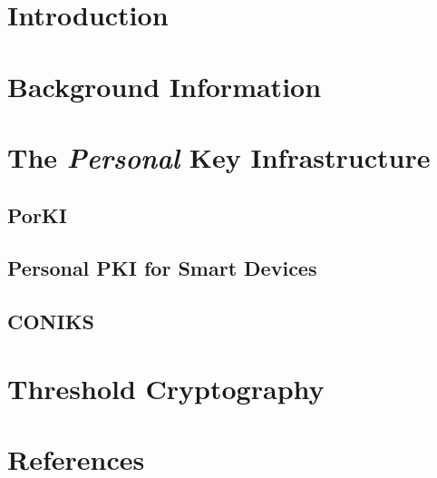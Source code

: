 \section{Introduction}


\section{Background Information}


\section{The \textit{Personal} Key Infrastructure}

\subsection{PorKI}

\subsection{Personal PKI for Smart Devices}

\subsection{CONIKS}

\section{Threshold Cryptography}


\section{References}

\section{}

